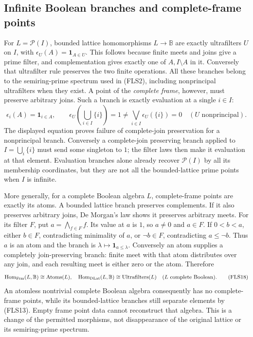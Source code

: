\documentclass[11pt]{article}
\begin{document}
\subsection{Infinite Boolean branches and complete-frame points}

For $L=\mathcal P(I)$, bounded lattice homomorphisms
$L\to\mathbb B$ are exactly ultrafilters $U$ on $I$,
with $\epsilon_U(A)=\mathbf1_{A\in U}$. This follows
because finite meets and joins give a prime filter,
and complementation gives exactly one of $A,I\setminus A$
in it. Conversely that ultrafilter rule preserves the
two finite operations. All these branches belong to
the semiring-prime spectrum used in (FLS2), including
nonprincipal ultrafilters when they exist. A point of
the \emph{complete frame}, however, must preserve
arbitrary joins. Such a branch is exactly evaluation
at a single $i\in I$:
\[
\epsilon_i(A)=\mathbf1_{i\in A},\qquad
\epsilon_U\left(\bigcup_{i\in I}\{i\}\right)=1
\ne\bigvee_{i\in I}\epsilon_U(\{i\})=0
\quad(U\text{ nonprincipal}).
\tag{FLS17}
\]
The displayed equation proves failure of complete-join
preservation for a nonprincipal branch. Conversely a
complete-join preserving branch applied to
$I=\bigcup_i\{i\}$ must send some singleton to $1$;
the filter laws then make it evaluation at that element.
Evaluation branches alone already recover $\mathcal P(I)$
by all its membership coordinates, but they are not all
the bounded-lattice prime points when $I$ is infinite.

More generally, for a complete Boolean algebra $L$,
complete-frame points are exactly its atoms. A bounded
lattice branch preserves complements. If it also preserves
arbitrary joins, De Morgan's law shows it preserves
arbitrary meets. For its filter $F$, put
$a=\bigwedge_{f\in F}f$. Its value at $a$ is $1$, so
$a\ne0$ and $a\in F$. If $0<b<a$, either $b\in F$,
contradicting minimality of $a$, or $\neg b\in F$,
contradicting $a\leq\neg b$. Thus $a$ is an atom and
the branch is $\lambda\mapsto\mathbf1_{a\leq\lambda}$.
Conversely an atom supplies a completely join-preserving
branch: finite meet with that atom distributes over any
join, and each resulting meet is either zero or the atom.
Therefore
\[
\operatorname{Hom}_{\rm Frm}(L,\mathbb B)
\cong\operatorname{Atoms}(L),
\quad
\operatorname{Hom}_{\rm DLat}(L,\mathbb B)
\cong\operatorname{Ultrafilters}(L)
\quad(L\text{ complete Boolean}).
\tag{FLS18}
\]
An atomless nontrivial complete Boolean algebra consequently
has no complete-frame points, while its bounded-lattice
branches still separate elements by (FLS13). Empty frame
point data cannot reconstruct that algebra. This is a
change of the permitted morphisms, not disappearance of
the original lattice or its semiring-prime spectrum.
\end{document}
